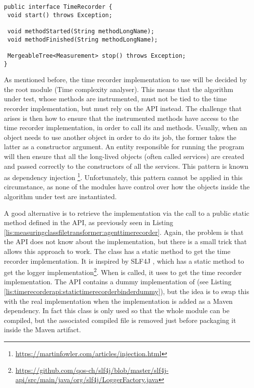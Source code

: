 \noindent\begin{minipage}[c]{\linewidth}
\begin{lstlisting}[breaklines,caption={TimeRecorder interface},label=lis:timerecorderapi:timerecorderinterface]
public interface TimeRecorder {
 void start() throws Exception;

 void methodStarted(String methodLongName);
 void methodFinished(String methodLongName);

 MergeableTree<Measurement> stop() throws Exception;
}
\end{lstlisting}
\end{minipage}

\noindent As mentioned before, the time recorder implementation to use will be decided by the root module (Time complexity analyser). This means that  the algorithm under test, whose methods are instrumented, must not be tied to the time recorder implementation, but must rely on the API instead. The challenge that arises is then how to ensure that the instrumented methods have access to the time recorder implementation, in order to call its  and  methods. Usually, when an object needs to use another object in order to do its job, the former takes the latter as a constructor argument. An entity responsible for running the program will then ensure that all the long-lived objects (often called services) are created and passed correctly to the constructors of all the services. This pattern is known as dependency injection \footnote{\url{https://martinfowler.com/articles/injection.html}}. Unfortunately, this pattern cannot be applied in this circumstance, as none of the modules have control over how the objects inside the algorithm under test are instantiated.

\noindent A good alternative is to retrieve the implementation via the call to a public static method defined in the API, as previously seen in Listing \ref{lis:measuringclassfiletransformer:agenttimerecorder}. Again, the problem is that the API does not know about the implementation, but there is a small trick that allows this approach to work. The class  has a static method  to get the time recorder implementation. It is inspired by SLF4J , which has a static method  to get the logger implementation\footnote{\url{https://github.com/qos-ch/slf4j/blob/master/slf4j-api/src/main/java/org/slf4j/LoggerFactory.java}}. When  is called, it uses  to get the time recorder implementation. The API contains a dummy implementation of  (see Listing \ref{lis:timerecorderapi:statictimerecorderbinderdummy}), but the idea is to swap this with the real implementation when the implementation is added as a Maven dependency. In fact this class is only used so that the whole module can be compiled, but the associated compiled  file is removed just before packaging it inside the Maven artifact.

